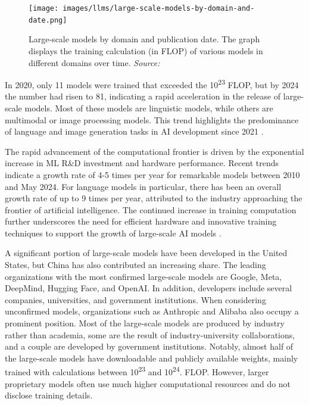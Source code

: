 \begin{figure}[h!]
    \centering
    \texttt{[image: images/llms/large-scale-models-by-domain-and-date.png]}
    \caption{Large-scale models by domain and publication date. The graph displays the training calculation (in FLOP) of various models in different domains over time. \textit{Source:} \cite{epoch2024trackinglargescaleaimodels}}
    \label{fig:large-scale-models}
\end{figure}

In 2020, only 11 models were trained that exceeded the 10\textsuperscript{23} FLOP, but by 2024 the number had risen to 81, indicating a rapid acceleration in the release of large-scale models. Most of these models are linguistic models, while others are multimodal or image processing models. This trend highlights the predominance of language and image generation tasks in AI development since 2021 \cite{epoch2024trackinglargescaleaimodels}.

The rapid advancement of the computational frontier is driven by the exponential increase in ML R\&D investment and hardware performance. Recent trends indicate a growth rate of 4-5 times per year for remarkable models between 2010 and May 2024. For language models in particular, there has been an overall growth rate of up to 9 times per year, attributed to the industry approaching the frontier of artificial intelligence. The continued increase in training computation further underscores the need for efficient hardware and innovative training techniques to support the growth of large-scale AI models \cite{epoch2024trainingcomputeoffrontieraimodelsgrowsby45xperyear}.

A significant portion of large-scale models have been developed in the United States, but China has also contributed an increasing share. The leading organizations with the most confirmed large-scale models are Google, Meta, DeepMind, Hugging Face, and OpenAI. In addition, developers include several companies, universities, and government institutions. When considering unconfirmed models, organizations such as Anthropic and Alibaba also occupy a prominent position. Most of the large-scale models are produced by industry rather than academia, some are the result of industry-university collaborations, and a couple are developed by government institutions. Notably, almost half of the large-scale models have downloadable and publicly available weights, mainly trained with calculations between 10\textsuperscript{23} and 10\textsuperscript{24}. FLOP. However, larger proprietary models often use much higher computational resources and do not disclose training details.

